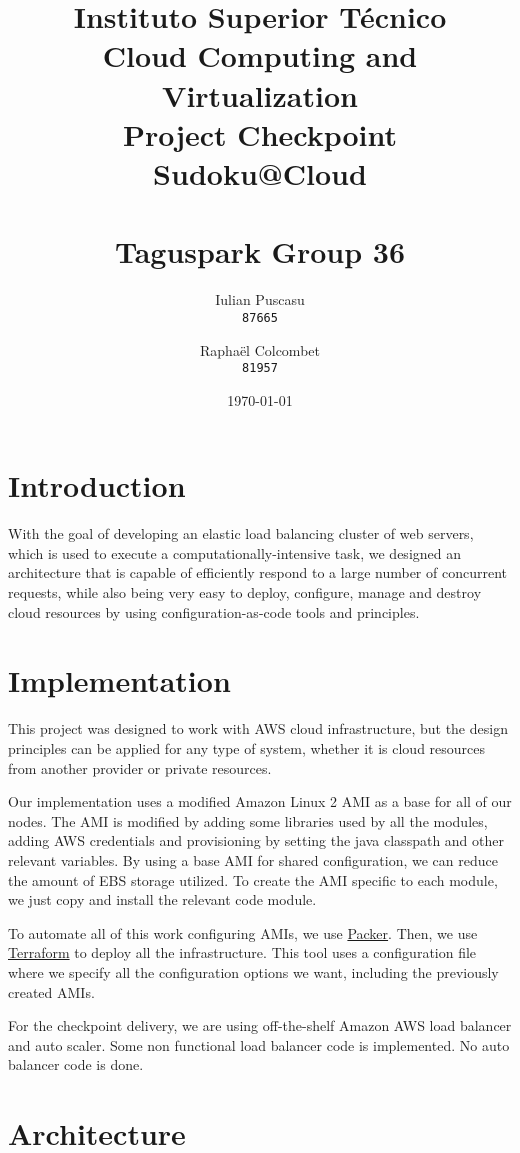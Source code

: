 \documentclass[10pt,twocolumn]{article}
\title{%
Instituto Superior Técnico\\
\huge Cloud Computing and Virtualization\\
\Large Project Checkpoint\\
\Huge Sudoku@Cloud\\
\ \\
\large Taguspark Group 36\\
}
\author{%
    Iulian Puscasu\\
    \texttt{87665}
    \and
    Raphaël Colcombet\\
    \texttt{81957}
}
\date{
    \today
}
\begin{document}
\maketitle

\section{Introduction}

With the goal of developing an elastic load balancing cluster of web servers, which is used to execute a computationally-intensive task,
we designed an architecture that is capable of efficiently respond to a large number of concurrent requests, while also being very easy to
deploy, configure, manage and destroy cloud resources by using configuration-as-code tools and principles.


\section{Implementation}

This project was designed to work with AWS cloud infrastructure, but the design principles can be applied for any type of system, whether it is
cloud resources from another provider or private resources.

Our implementation uses a modified Amazon Linux 2 AMI as a base for all of our nodes.
The AMI is modified by adding some libraries used by all the modules, adding AWS credentials and provisioning by setting the java classpath and
other relevant variables. By using a base AMI for shared configuration, we can reduce the amount of EBS storage utilized. To create the AMI
specific to each module, we just copy and install the relevant code module.

To automate all of this work configuring AMIs, we use \href{https://packer.io/}{Packer}.
Then, we use \href{https://www.terraform.io/}{Terraform} to deploy all the infrastructure. This tool uses a configuration file where we specify
all the configuration options we want, including the previously created AMIs.

For the checkpoint delivery, we are using off-the-shelf Amazon AWS load balancer and auto scaler.
Some non functional load balancer code is implemented. No auto balancer code is done.

\section{Architecture}
\end{document}
